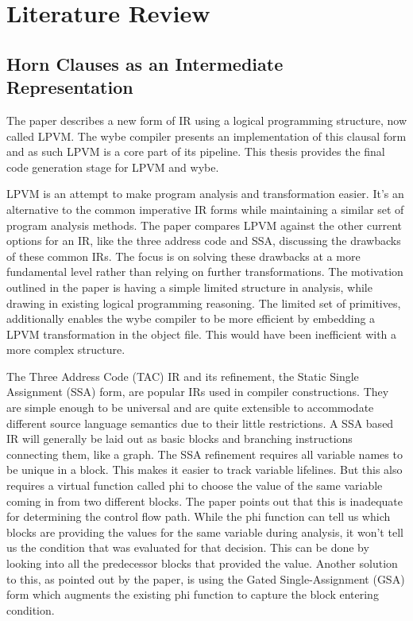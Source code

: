 \chapter{Literature Review}


\section{Horn Clauses as an Intermediate Representation}

The paper describes a new form of IR using a logical programming structure, now
called LPVM. The wybe compiler presents an implementation of this clausal form
and as such LPVM is a core part of its pipeline. This thesis provides the final
code generation stage for LPVM and wybe.

LPVM is an attempt to make program analysis and transformation easier. It's an
alternative to the common imperative IR forms while maintaining a similar set
of program analysis methods. The paper compares LPVM against the other current
options for an IR, like the three address code and SSA, discussing the
drawbacks of these common IRs. The focus is on solving these drawbacks at a
more fundamental level rather than relying on further transformations. The
motivation outlined in the paper is having a simple limited structure in
analysis, while drawing in existing logical programming reasoning. The limited
set of primitives, additionally enables the wybe compiler to be more efficient
by embedding a LPVM transformation in the object file. This would have been
inefficient with a more complex structure.

The Three Address Code (TAC) IR and its refinement, the Static Single
Assignment (SSA) form, are popular IRs used in compiler constructions. They are
simple enough to be universal and are quite extensible to accommodate different
source language semantics due to their little restrictions. A SSA based IR will
generally be laid out as basic blocks and branching instructions connecting
them, like a graph. The SSA refinement requires all variable names to be unique
in a block. This makes it easier to track variable lifelines. But
this also requires a virtual function called phi to choose the value of the
same variable coming in from two different blocks. The paper points out that
this is inadequate for determining the control flow path. While the phi
function can tell us which blocks are providing the values for the same
variable during analysis, it won't tell us the condition that was evaluated for
that decision. This can be done by looking into all the predecessor blocks that
provided the value. Another solution to this, as pointed out by the paper, is
using the Gated Single-Assignment (GSA) form which augments the existing phi
function to capture the block entering condition.

